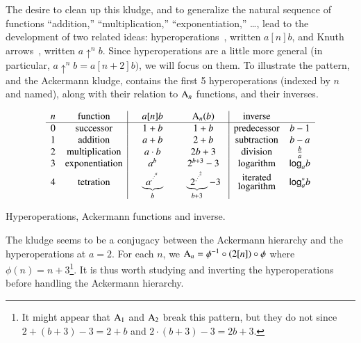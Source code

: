 The desire to clean up this kludge, and to generalize the natural sequence of functions ``addition,'' ``multiplication,'' ``exponentiation,'' \ldots, lead to the development of two related ideas: hyperoperations~\cite{blah}, written $a [n] b$, and Knuth arrows~\cite{blah}, written $a \uparrow^n b$.  Since hyperoperations are a little more general (in particular, $a \uparrow^n b = a[n+2]b)$, we will focus on them.
To illustrate the pattern, and the Ackermann kludge,  contains the first 5 hyperoperations (indexed by $n$ and named), along with their relation to $\text{A}_n$ functions, and their inverses.
\begin{table}[h]
	\[
\begin{array}{cc|cc|cc}
n & \text{function} & \quad a [n] b \quad & \quad \Ack_n(b) \quad & \text{inverse} \\
\hline
0 & \text{successor} & 1 + b & 1 + b & \text{predecessor} & b - 1 \\
1 & \text{addition} & a + b & 2 + b & \text{subtraction} & b - a \\
2 & \text{multiplication} & a \cdot b & 2b + 3 & \text{division} & \frac{b}{a}\\
3 & \text{exponentiation} & a^b & 2^{b + 3} - 3 & \text{logarithm} & \mathsf{log}_a b \\
[2pt]
4 & \text{tetration} & \underbrace{a^{.^{.^{.^a}}}}_b & \underbrace{2^{.^{.^{.^2}}}}_{b+3} - 3 & \begin{array}{@{}c@{}}\text{iterated}\\[-3pt]\text{logarithm}\end{array} & \mathsf{log}^*_a b 
\end{array}
\] \caption{Hyperoperations, Ackermann functions and inverse.}
\label{table: hyperop-ack-inv}
\end{table}

The kludge seems to be a conjugacy between the Ackermann hierarchy and the hyperoperations at $a=2$. For each $n$, we $\text{A}_n = \phi^{-1}\circ \left(2[n]\right)\circ\phi$ where $\phi(n) = n+3$\footnote{It might appear that $\text{A}_{1}$ and $\text{A}_{2}$ break this pattern, but they do not since $2 + (b + 3) - 3 = 2 + b$ and $2 \cdot (b + 3) - 3 = 2b + 3$.}. It is thus worth studying and inverting the hyperoperations before handling the Ackermann hierarchy.

